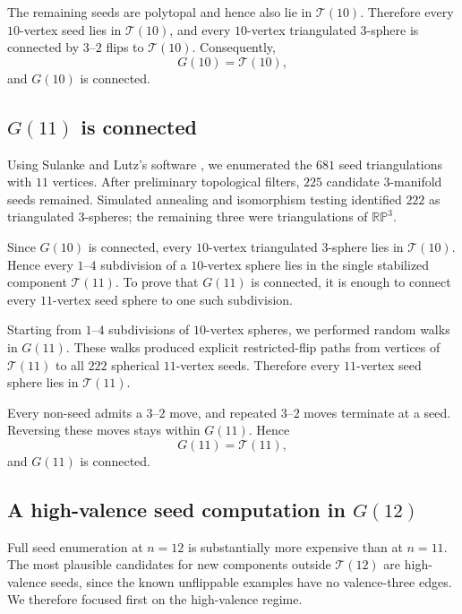 \documentclass[11pt]{article}
\theoremstyle{remark}
\theoremstyle{plain}
\begin{document}
The remaining seeds are polytopal and hence also lie in \(\mathcal T(10)\).
Therefore every \(10\)-vertex seed lies in \(\mathcal T(10)\), and every
\(10\)-vertex triangulated \(3\)-sphere is connected by \(3\)--\(2\) flips
to \(\mathcal T(10)\).  Consequently,
\[
 G(10)=\mathcal T(10),
\]
and \(G(10)\) is connected.

\subsection{\texorpdfstring{\(G(11)\)}{G(11)} is connected}

Using Sulanke and Lutz's software \cite{SL09}, we enumerated the \(681\) seed
triangulations with \(11\) vertices.  After preliminary topological filters,
\(225\) candidate \(3\)-manifold seeds remained.  Simulated annealing and
isomorphism testing identified \(222\) as triangulated \(3\)-spheres; the
remaining three were triangulations of \(\mathbb{RP}^3\).

Since \(G(10)\) is connected, every \(10\)-vertex triangulated
\(3\)-sphere lies in \(\mathcal T(10)\).  Hence every \(1\)--\(4\)
subdivision of a \(10\)-vertex sphere lies in the single stabilized component
\(\mathcal T(11)\).  To prove that \(G(11)\) is connected, it is
enough to connect every \(11\)-vertex seed sphere to one such subdivision.

Starting from \(1\)--\(4\) subdivisions of \(10\)-vertex spheres, we
performed random walks in \(G(11)\).  These walks produced explicit
restricted-flip paths from vertices of \(\mathcal T(11)\) to all \(222\) spherical
\(11\)-vertex seeds.  Therefore every \(11\)-vertex seed sphere lies in
\(\mathcal T(11)\).

Every non-seed admits a \(3\)--\(2\) move, and repeated \(3\)--\(2\) moves
terminate at a seed.  Reversing these moves stays within \(G(11)\).
Hence
\[
 G(11)=\mathcal T(11),
\]
and \(G(11)\) is connected.

\subsection{A high-valence seed computation in \texorpdfstring{\(G(12)\)}{G(12)}}

Full seed enumeration at \(n=12\) is substantially more expensive than at
\(n=11\).  The most plausible candidates for new components outside
\(\mathcal T(12)\) are high-valence seeds, since the known unflippable examples have no
valence-three edges.  We therefore focused first on the high-valence regime.
\end{document}
